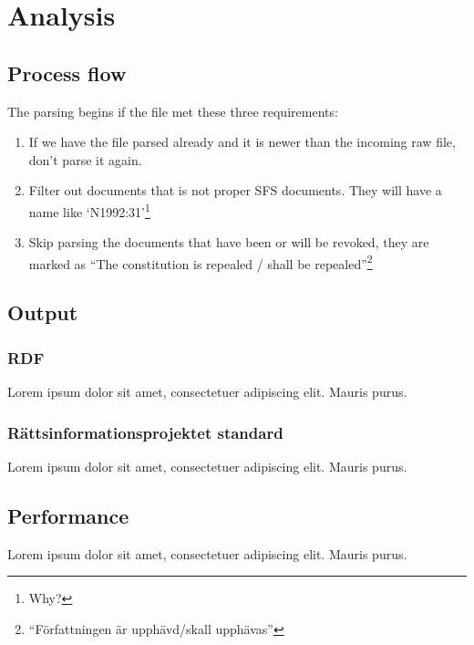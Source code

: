 \chapter{Analysis}

\section{Process flow}

The parsing begins if the file met these three requirements:
\begin{enumerate}
\item If we have the file parsed already and it is newer than the incoming raw file, don't parse it again.
\item Filter out documents that is not proper SFS documents. They will have a name like ‘N1992:31’\footnote{Why?}
\item Skip parsing the documents that have been or will be revoked, they are marked as “The constitution is repealed / shall be repealed”\footnote{“Författningen är upphävd/skall upphävas”}
\end{enumerate}

\section{Output}

\subsection{RDF}

Lorem ipsum dolor sit amet, consectetuer adipiscing elit. Mauris
purus.

\subsection{Rättsinformationsprojektet standard}

Lorem ipsum dolor sit amet, consectetuer adipiscing elit. Mauris
purus.  

\section{Performance}

Lorem ipsum dolor sit amet, consectetuer adipiscing elit. Mauris
purus. 
